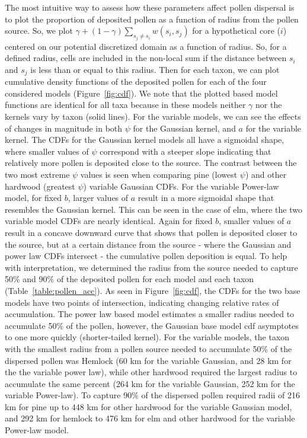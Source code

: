 \documentclass[12pt]{article}
\begin{document}
The most intuitive way to assess how these parameters affect pollen
dispersal is to plot the proportion of deposited pollen as a function
of radius from the pollen source. So, we plot $\gamma + (1- \gamma)
\sum_{s_j \neq s_i} w(s_i, s_j)$ for a hypothetical core ($i$)
centered on our potential discretized domain as a function of
radius. So, for a defined radius, cells are included in the non-local
sum if the distance between $s_i$ and $s_j$ is less than or equal to
this radius. Then for each taxon, we can plot cumulative density
functions of the deposited pollen for each of the four considered
models (Figure~\ref{fig:cdf}). We note that the plotted based model
functions are identical for all taxa because in these models neither
$\gamma$ nor the kernels vary by taxon (solid lines).  For the
variable models, we can see the effects of changes in magnitude in
both $\psi$ for the Gaussian kernel, and $a$ for the variable
kernel. The CDFs for the Gaussian kernel models all have a sigmoidal
shape, where smaller values of $\psi$ correspond with a steeper slope
indicating that relatively more pollen is deposited close to the
source. The contrast between the two most extreme $\psi$ values is
seen when comparing pine (lowest $\psi$) and other hardwood (greatest
$\psi$) variable Gaussian CDFs. For the variable Power-law model, for
fixed $b$, larger values of $a$ result in a more sigmoidal shape that
resembles the Gaussian kernel. This can be seen in the case of elm,
where the two variable model CDFs are nearly identical. Again for
fixed $b$, smaller values of $a$ result in a concave downward curve
that shows that pollen is deposited closer to the source, but at a
certain distance from the source - where the Gaussian and power law
CDFs intersect - the cumulative pollen deposition is equal. To help
with interpretation, we determined the radius from the source needed
to capture 50\% and 90\% of the deposited pollen for each model and
each taxon (Table~\ref{table:pollen_acc}). As seen in
Figure~\ref{fig:cdf}, the CDFs for the two base models have two points
of intersection, indicating changing relative rates of
accumulation. The power law based model estimates a smaller radius
needed to accumulate 50\% of the pollen, however, the Gaussian base
model cdf asymptotes to one more quickly (shorter-tailed kernel). For
the variable models, the taxon with the smallest radius from a pollen
source needed to accumulate 50\% of the dispersed pollen was Hemlock
(60 km for the variable Gaussian, and 28 km for the the variable power
law), while other hardwood required the largest radius to accumulate
the same percent (264 km for the variable Gaussian, 252 km for the
variable Power-law). To capture 90\% of the dispersed pollen required
radii of 216 km for pine up to 448 km for other hardwood for the
variable Gaussian model, and 292 km for hemlock to 476 km for elm and
other hardwood for the variable Power-law model.
\end{document}

